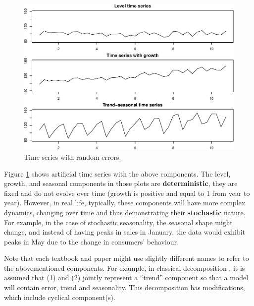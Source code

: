 \documentclass[
]{book}
\theoremstyle{definition}
\theoremstyle{definition}
\theoremstyle{definition}
\theoremstyle{definition}
\theoremstyle{remark}
\begin{document}
\begin{figure}
\centering
\includegraphics{Svetunkov--2022----ADAM_files/figure-latex/allExample-1.pdf}
\caption{\label{fig:allExample}Time series with random errors.}
\end{figure}

Figure \ref{fig:allExample} shows artificial time series with the above components. The level, growth, and seasonal components in those plots are \textbf{deterministic}, they are fixed and do not evolve over time (growth is positive and equal to 1 from year to year). However, in real life, typically, these components will have more complex dynamics, changing over time and thus demonstrating their \textbf{stochastic} nature. For example, in the case of stochastic seasonality, the seasonal shape might change, and instead of having peaks in sales in January, the data would exhibit peaks in May due to the change in consumers' behaviour.

Note that each textbook and paper might use slightly different names to refer to the abovementioned components. For example, in classical decomposition \citep{Persons1919}, it is assumed that (1) and (2) jointly represent a ``trend'' component so that a model will contain error, trend and seasonality. This decomposition has modifications, which include cyclical component(s).
\end{document}
